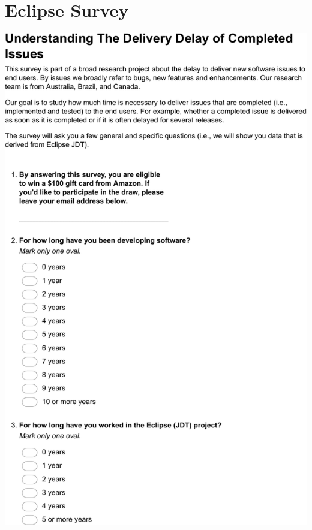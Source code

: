 \chapter{Eclipse Survey}\label{appendix:c}

\includegraphics[width=.9\textwidth]{chapters/chapter5/appendix/Eclipse1.pdf}

